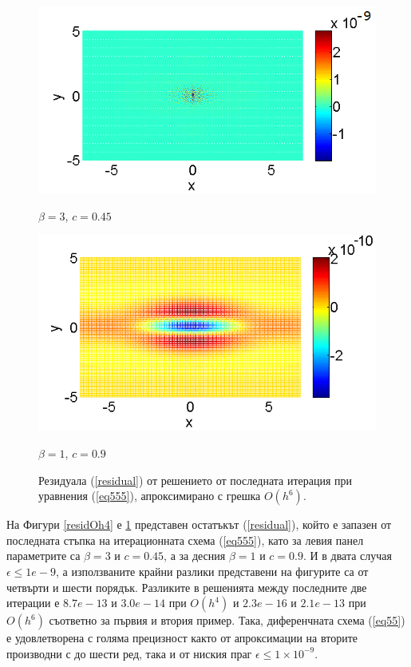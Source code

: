 \documentclass[a4paper]{article}
\newcommand{\rf}[1]{(\ref{#1})}
\theoremstyle{remark}
\begin{document}
\begin{figure}[ht]
	\begin{minipage}[b]{0.45\linewidth}
		\raggedleft
		\includegraphics[width=\linewidth]{residual/residual_bt3c045_Oh6.png}
		\centerline{$\beta = 3$, $c = 0.45$}	
	\end{minipage}	
	\begin{minipage}[b]{0.41625\linewidth}	
		 \includegraphics[width=\linewidth]{residual/residual_bt1c090_Oh6.png}
		\centerline{$\beta = 1$, $c = 0.9$ }
	\end{minipage}

	\caption{Резидуала \rf{residual} от решението от последната итерация при уравнения \rf{eq555}, апроксимирано с грешка  $O(h^6)$. }
	\label{residOh6}
\end{figure}
\FloatBarrier
На Фигури \ref{residOh4} е \ref{residOh6} представен остатъкът \rf{residual}, който е запазен от последната стъпка на итерационната схема \rf{eq555}, като за левия панел  параметрите са $\beta = 3$ и $c = 0.45$, а за десния $\beta = 1$ и $c = 0.9$. И в двата случая $\epsilon \le 1e-9$, а използваните крайни разлики представени на фигурите са от четвърти и шести порядък. Разликите в решенията между последните две итерации е $8.7e-13$ и $3.0e-14$ при $O(h^4)$ и $2.3e-16$ и $2.1e-13$ при $O(h^6)$ съответно за първия и втория пример. Така, диференчната схема \rf{eq55} е удовлетворена с голяма прецизност както от апроксимации на вторите производни с до шести ред, така и от ниския праг $\epsilon \le 1\times10^{-9}$. 
\end{document}
